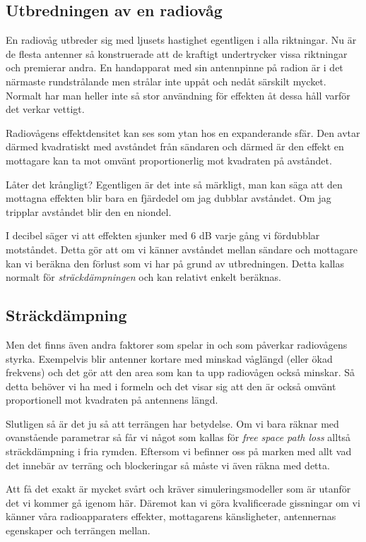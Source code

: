 \subsection{Utbredningen av en radiovåg}

En radiovåg utbreder sig med ljusets hastighet egentligen i alla riktningar. Nu är de flesta antenner så konstruerade att de kraftigt undertrycker vissa riktningar och premierar andra. En handapparat med sin antennpinne på radion är i det närmaste rundstrålande men strålar inte uppåt och nedåt särskilt mycket. Normalt har man heller inte så stor användning för effekten åt dessa håll varför det verkar vettigt.

Radiovågens effektdensitet kan ses som ytan hos en expanderande sfär. Den avtar därmed kvadratiskt med avståndet från sändaren och därmed är den effekt en mottagare kan ta mot omvänt proportionerlig mot kvadraten på avståndet.

Låter det krångligt? Egentligen är det inte så märkligt, man kan säga att den mottagna effekten blir bara en fjärdedel om jag dubblar avståndet. Om jag tripplar avståndet blir den en niondel.

I decibel säger vi att effekten sjunker med 6 dB varje gång vi fördubblar motståndet. Detta gör att om vi känner avståndet mellan sändare och mottagare kan vi beräkna den förlust som vi har på grund av utbredningen. Detta kallas normalt för \textit{sträckdämpningen} och kan relativt enkelt beräknas.

\subsection{Sträckdämpning}

Men det finns även andra faktorer som spelar in och som påverkar radiovågens styrka. Exempelvis blir antenner kortare med minskad våglängd (eller ökad frekvens) och det gör att den area som kan ta upp radiovågen också minskar. Så detta behöver vi ha med i formeln och det visar sig att den är också omvänt proportionell mot kvadraten på antennens längd.

Slutligen så är det ju så att terrängen har betydelse. Om vi bara räknar med ovanstående parametrar så får vi något som kallas för \textit{free space path loss} alltså sträckdämpning i fria rymden. Eftersom vi befinner oss på marken med allt vad det innebär av terräng och blockeringar så måste vi även räkna med detta.

Att få det exakt är mycket svårt och kräver simuleringsmodeller som är utanför det vi kommer gå igenom här. Däremot kan vi göra kvalificerade gissningar om vi känner våra radioapparaters effekter, mottagarens känsligheter, antennernas egenskaper och terrängen mellan.

